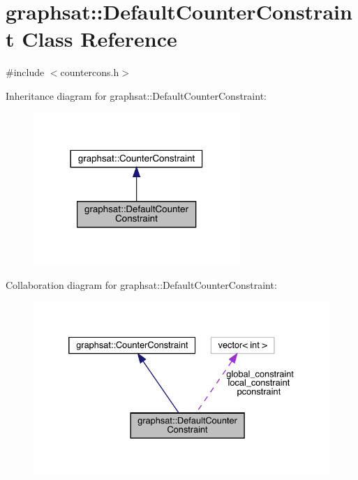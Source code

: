 \hypertarget{classgraphsat_1_1_default_counter_constraint}{}\section{graphsat\+::Default\+Counter\+Constraint Class Reference}
\label{classgraphsat_1_1_default_counter_constraint}


{\ttfamily \#include $<$countercons.\+h$>$}



Inheritance diagram for graphsat\+::Default\+Counter\+Constraint\+:\nopagebreak
\begin{figure}[H]
\begin{center}
\leavevmode
\includegraphics[width=222pt]{classgraphsat_1_1_default_counter_constraint__inherit__graph}
\end{center}
\end{figure}


Collaboration diagram for graphsat\+::Default\+Counter\+Constraint\+:
\nopagebreak
\begin{figure}[H]
\begin{center}
\leavevmode
\includegraphics[width=332pt]{classgraphsat_1_1_default_counter_constraint__coll__graph}
\end{center}
\end{figure}
